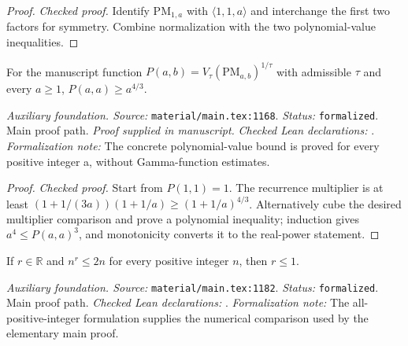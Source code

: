 \begin{proof}
\leanok
{}
\textit{Checked proof.} Identify $\mathrm{PM}_{1,a}$ with $\langle1,1,a\rangle$ and interchange the first two factors for symmetry. Combine normalization with the two polynomial-value inequalities.
\end{proof}

\renewcommand{\thetheorem}{A13}
\begin{lemma}
\label{aux:polynomial-value-elementary-growth}
\manuscriptproof
{}
\leanok
For the manuscript function $P(a,b)=V_\tau(\mathrm{PM}_{a,b})^{1/\tau}$ with admissible $\tau$ and every $a\ge1$, $P(a,a)\ge a^{4/3}$.
\end{lemma}

\noindent\textit{Auxiliary foundation. Source:} \texttt{material/main.tex:1168}.
\textit{Status:} \texttt{formalized}. Main proof path.
\textit{Proof supplied in manuscript.}
\textit{Checked Lean declarations:} .
\textit{Formalization note:} The concrete polynomial-value bound is proved for every positive integer a, without Gamma-function estimates.

\begin{proof}
\leanok
{}
\textit{Checked proof.} Start from $P(1,1)=1$. The recurrence multiplier is at least $(1+1/(3a))(1+1/a)\ge(1+1/a)^{4/3}$. Alternatively cube the desired multiplier comparison and prove a polynomial inequality; induction gives $a^4\le P(a,a)^3$, and monotonicity converts it to the real-power statement.
\end{proof}

\renewcommand{\thetheorem}{A14}
\begin{lemma}
\label{aux:power-growth-comparison}
\leanok
If $r\in\mathbb R$ and $n^r\le2n$ for every positive integer $n$, then $r\le1$.
\end{lemma}

\noindent\textit{Auxiliary foundation. Source:} \texttt{material/main.tex:1182}.
\textit{Status:} \texttt{formalized}. Main proof path.
\textit{Checked Lean declarations:} .
\textit{Formalization note:} The all-positive-integer formulation supplies the numerical comparison used by the elementary main proof.

